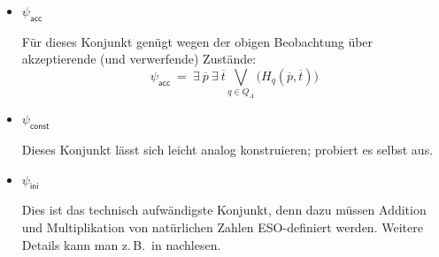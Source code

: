 \documentclass[fontsize=11pt, twoside=false, numbers=autoenddot]{scrbook}
\begin{document}
\begin{itemize}
    \begin{align*}
      \psi_{\textsf{move}} & ~=~
      \forall\:\! \overline{t}~
      \forall\:\! \overline{t}' \Bigg(
        \varphi_{\textsf{nf}}(\overline{t},\overline{t}') ~\to
        \bigvee_{(q,a,q',b,M) \in \Delta} \alpha_{q,a,q',b,M} (\overline{t},\overline{t}') ~\lor~
        \psi_{\textsf{term}} (\overline{t},\overline{t}')
      \Bigg),
      \intertext{wobei}
      \alpha_{q,a,q',b,\text{{\boldmath $R$}}} (\overline{t},\overline{t}') & ~=~
      \exists\:\! \overline{p}~
      \exists\:\! \overline{p}' \Bigg(
        H_q (\overline{p},\overline{t}) \land T_a (\overline{p},\overline{t}) \land
        H_{q'} (\overline{p}',\overline{t}') \land T_b (\overline{p}',\overline{t}') \land
        \text{{\boldmath $\varphi_{\textsf{nf}} (\overline{t},\overline{t}')$}}
      \Bigg), \\
      \alpha_{q,a,q',b,\text{{\boldmath $L$}}} (\overline{t},\overline{t}') & ~=~
      \exists\:\! \overline{p}~
      \exists\:\! \overline{p}' \Bigg(
        H_q (\overline{p},\overline{t}) \land T_a (\overline{p},\overline{t}) \land
        H_{q'} (\overline{p}',\overline{t}') \land T_b (\overline{p}',\overline{t}') \land
        \text{{\boldmath $\varphi_{\textsf{nf}} (\overline{t}',\overline{t})$}}
      \Bigg)
      \intertext{und}
      \psi_{\textsf{term}} (\overline{t},\overline{t}') & ~=~
      \exists\:\! \overline{p}
      \bigvee_{q \in Q_A \cup Q_R}\Bigg(
        H_q (\overline{p},\overline{t}) \land
        H_q (\overline{p},\overline{t}')
      \Bigg).
    \end{align*}
  \item
    {\boldmath $\psi_{\textsf{acc}}$}
    \par
    Für dieses Konjunkt genügt wegen der obigen Beobachtung über akzeptierende (und verwerfende) Zustände:
    \[
      \psi_{\textsf{acc}}  ~=~
      \exists\:\! \overline{p}~
      \exists\:\! \overline{t}
      \bigvee_{q \in Q_A}\Bigg(
        H_q (\overline{p},\overline{t})
      \Bigg)
    \]
  \item
    {\boldmath $\psi_{\textsf{const}}$}
    \par
    Dieses Konjunkt lässt sich leicht analog konstruieren;
    probiert es selbst aus.
  \item
    {\boldmath $\psi_{\textsf{ini}}$}
    \par
    Dies ist das technisch aufwändigste Konjunkt,
    denn dazu müssen Addition und Multiplikation von natürlichen Zahlen
    ESO-definiert werden.
    Weitere Details kann man z.\,B.\ in \cite{EF99,Imm99} nachlesen.
\end{itemize}
\end{document}
